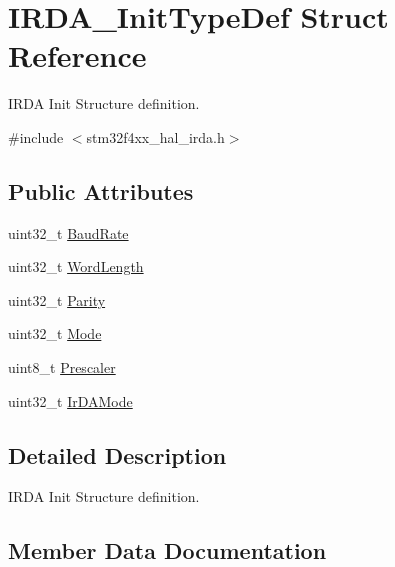 \hypertarget{struct_i_r_d_a___init_type_def}{}\section{I\+R\+D\+A\+\_\+\+Init\+Type\+Def Struct Reference}
\label{struct_i_r_d_a___init_type_def}


I\+R\+DA Init Structure definition.  




{\ttfamily \#include $<$stm32f4xx\+\_\+hal\+\_\+irda.\+h$>$}

\subsection*{Public Attributes}
\begin{DoxyCompactItemize}
\item 
uint32\+\_\+t \hyperlink{struct_i_r_d_a___init_type_def_a3a96057c13882e04fde01040b18a0eec}{Baud\+Rate}
\item 
uint32\+\_\+t \hyperlink{struct_i_r_d_a___init_type_def_a0a9bfafe2a9b00be86cd7b75788391ed}{Word\+Length}
\item 
uint32\+\_\+t \hyperlink{struct_i_r_d_a___init_type_def_ac8a66f175e3502bba61409c7c08649b0}{Parity}
\item 
uint32\+\_\+t \hyperlink{struct_i_r_d_a___init_type_def_ad10e4fcdb63d30534ce771d57c0f3ffb}{Mode}
\item 
uint8\+\_\+t \hyperlink{struct_i_r_d_a___init_type_def_afb7e30279f08cd39a40ec49e8887fe36}{Prescaler}
\item 
uint32\+\_\+t \hyperlink{struct_i_r_d_a___init_type_def_a88f1b73ae470fddd4e75b70cf5175040}{Ir\+D\+A\+Mode}
\end{DoxyCompactItemize}


\subsection{Detailed Description}
I\+R\+DA Init Structure definition. 

\subsection{Member Data Documentation}
